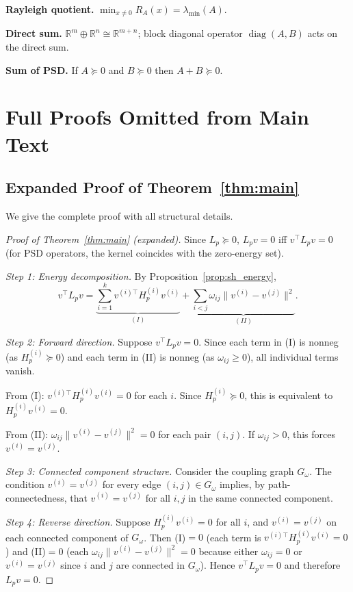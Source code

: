 \documentclass[11pt]{article}
\theoremstyle{definition}
\theoremstyle{remark}
\newcommand{\R}{\mathbb{R}}
\newcommand{\Gom}{G_\omega}
\DeclareMathOperator{\diag}{diag}
\begin{document}
\textbf{Rayleigh quotient.} $\min_{x\neq 0}R_A(x)=\lambda_{\min}(A)$.

\textbf{Direct sum.} $\R^m\oplus\R^n\cong\R^{m+n}$; block diagonal operator
$\diag(A,B)$ acts on the direct sum.

\textbf{Sum of PSD.} If $A\succeq 0$ and $B\succeq 0$ then $A+B\succeq 0$.

\clearpage
\section{Full Proofs Omitted from Main Text}
\label{app:proofs}

\subsection{Expanded Proof of Theorem~\ref{thm:main}}

We give the complete proof with all structural details.

\begin{proof}[Proof of Theorem~\ref{thm:main} (expanded)]
Since $L_p\succeq 0$, $L_p v=0$ iff $v^\top L_p v = 0$ (for PSD operators,
the kernel coincides with the zero-energy set).

\textit{Step 1: Energy decomposition.} By Proposition~\ref{prop:sh_energy},
\[
  v^\top L_p v = \underbrace{\sum_{i=1}^k v^{(i)\top}H_p^{(i)}v^{(i)}}_{(I)}
  + \underbrace{\sum_{i<j}\omega_{ij}\|v^{(i)}-v^{(j)}\|^2}_{(II)}.
\]

\textit{Step 2: Forward direction.} Suppose $v^\top L_p v=0$. Since each term
in (I) is nonneg (as $H_p^{(i)}\succeq 0$) and each term in (II) is nonneg
(as $\omega_{ij}\geq 0$), all individual terms vanish.

From (I): $v^{(i)\top}H_p^{(i)}v^{(i)}=0$ for each $i$. Since
$H_p^{(i)}\succeq 0$, this is equivalent to $H_p^{(i)}v^{(i)}=0$.

From (II): $\omega_{ij}\|v^{(i)}-v^{(j)}\|^2=0$ for each pair $(i,j)$. If
$\omega_{ij}>0$, this forces $v^{(i)}=v^{(j)}$.

\textit{Step 3: Connected component structure.} Consider the coupling graph
$\Gom$. The condition $v^{(i)}=v^{(j)}$ for every edge $(i,j)\in\Gom$ implies,
by path-connectedness, that $v^{(i)}=v^{(j)}$ for all $i,j$ in the same
connected component.

\textit{Step 4: Reverse direction.} Suppose $H_p^{(i)}v^{(i)}=0$ for all $i$,
and $v^{(i)}=v^{(j)}$ on each connected component of $\Gom$. Then (I)$=0$
(each term is $v^{(i)\top}H_p^{(i)}v^{(i)}=0$) and (II)$=0$ (each
$\omega_{ij}\|v^{(i)}-v^{(j)}\|^2=0$ because either $\omega_{ij}=0$ or
$v^{(i)}=v^{(j)}$ since $i$ and $j$ are connected in $\Gom$). Hence
$v^\top L_p v=0$ and therefore $L_p v=0$.
\end{proof}
\end{document}
